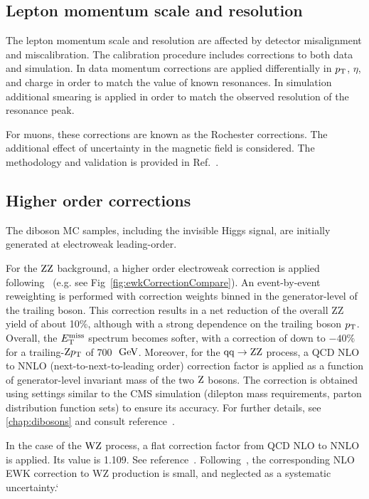 \subsection{Lepton momentum scale and resolution}
\label{subsec:lepres}
The lepton momentum scale and resolution are affected by detector misalignment 
and miscalibration. The calibration procedure includes corrections to both 
data and simulation. In data momentum corrections are applied differentially 
in $p_{\mathrm{T}}$, $\eta$, and charge in order to match the value of known resonances. 
In simulation additional smearing is applied in order to match the observed 
resolution of the resonance peak.

For muons, these corrections are known as the Rochester corrections.
The additional effect of uncertainty in the magnetic field is considered.
The methodology and validation is provided in Ref.~\cite{Bodek:2012id}.

\subsection{Higher order corrections}
\label{sec:higher-order-corrections}
The diboson MC samples, including the invisible Higgs signal, are initially generated at electroweak leading-order.

For the $\mathrm{Z}\mathrm{Z}$ background, a higher order electroweak correction is applied following~\cite{Bierweiler:2013dja,Gieseke:2014gka} (e.g. see
  Fig~\ref{fig:ewkCorrectionCompare}). An event-by-event reweighting is performed with correction weights binned in the generator-level \pt of the trailing boson.
This correction results in a net reduction of the overall ZZ yield of about 10\%, although with a strong dependence on the trailing boson $p_{\mathrm{T}}$.
Overall, the $E_\mathrm{T}^{\mathrm{miss}}$ spectrum becomes softer, with a correction of down to $-40\%$ for a trailing-$\mathrm{Z} p_{\mathrm{T}}$ of 700~$\,\text{Ge\hspace{-.08em}V}$. 
Moreover, for the $\mathrm{q}\mathrm{q} \to \mathrm{Z}\mathrm{Z}$ process, a QCD NLO to NNLO (next-to-next-to-leading order) correction factor 
is applied as a function of generator-level invariant mass of the two $\mathrm{Z}$ bosons.
The correction is obtained using settings similar to the CMS simulation (dilepton mass requirements, parton distribution function sets) to ensure its accuracy.
For further details, see \autoref{chap:dibosons} and consult reference~\cite{Grazzini:2015hta}. 

In the case of the $\mathrm{W}\mathrm{Z}$ process, a flat correction factor from QCD NLO to NNLO is applied. Its value is 1.109. See reference~\cite{Grazzini:2016swo}.
Following~\cite{Baglio:113005}, the corresponding NLO EWK correction to WZ production is small, and neglected as a systematic uncertainty.`

